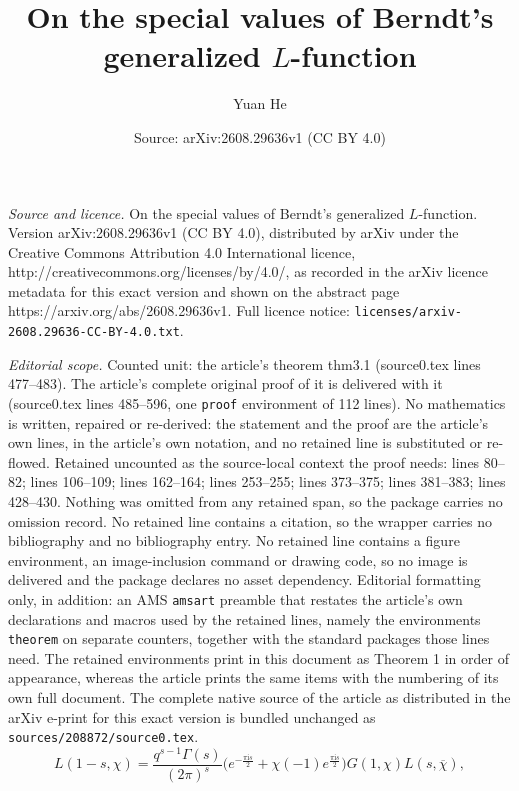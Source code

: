 \documentclass[10pt,a4paper]{amsart}
\title{On the special values of Berndt's generalized $L$-function}
\author{Yuan He}
\date{Source: arXiv:2608.29636v1 (CC BY 4.0)}
\begin{document}
\maketitle

\noindent\emph{Source and licence.} On the special values of Berndt's generalized $L$-function. Version arXiv:2608.29636v1 (CC BY 4.0), distributed by arXiv under the Creative Commons Attribution 4.0 International licence, http://creativecommons.org/licenses/by/4.0/, as recorded in the arXiv licence metadata for this exact version and shown on the abstract page https://arxiv.org/abs/2608.29636v1. Full licence notice: \texttt{licenses/arxiv-2608.29636-CC-BY-4.0.txt}.\par\smallskip

\noindent\textit{Editorial scope.} Counted unit: the article's theorem thm3.1 (source0.tex lines 477--483). The article's complete original proof of it is delivered with it (source0.tex lines 485--596, one \texttt{proof} environment of 112 lines). No mathematics is written, repaired or re-derived: the statement and the proof are the article's own lines, in the article's own notation, and no retained line is substituted or re-flowed.  Retained uncounted as the source-local context the proof needs: lines 80--82; lines 106--109; lines 162--164; lines 253--255; lines 373--375; lines 381--383; lines 428--430.  Nothing was omitted from any retained span, so the package carries no omission record.  No retained line contains a citation, so the wrapper carries no bibliography and no bibliography entry.  No retained line contains a figure environment, an image-inclusion command or drawing code, so no image is delivered and the package declares no asset dependency.  Editorial formatting only, in addition: an AMS \texttt{amsart} preamble that restates the article's own declarations and macros used by the retained lines, namely the environments \texttt{theorem} on separate counters, together with the standard packages those lines need.  The retained environments print in this document as Theorem 1 in order of appearance, whereas the article prints the same items with the numbering of its own full document.  The complete native source of the article as distributed in the arXiv e-print for this exact version is bundled unchanged as \texttt{sources/208872/source0.tex}.
\begin{equation}\label{eq1.11}
L(1-s,\chi)=\frac{q^{s-1}\Gamma(s)}{(2\pi)^{s}}\bigl(e^{-\frac{\pi \mathrm{i}s}{2}}+\chi(-1)e^{\frac{\pi \mathrm{i}s}{2}}\bigl)G(1,\chi)L(s,\overline{\chi}),
\end{equation}
\end{document}
